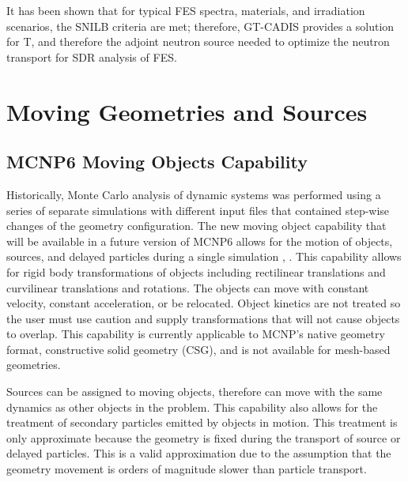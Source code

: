 It has been shown that for typical FES spectra, materials, and irradiation
scenarios, the SNILB criteria are met; therefore, GT-CADIS provides a solution
for T, and therefore the adjoint neutron source needed to optimize the neutron
transport for SDR analysis of FES.


\section{Moving Geometries and Sources} \label{sec:moving_sys}

\subsection{MCNP6 Moving Objects Capability} \label{sec:mcnp_move}
Historically, Monte Carlo analysis of dynamic systems was performed using a 
series of separate simulations with different input files that contained 
step-wise changes of the geometry configuration. 
The new moving object capability that will be available in a future version
of MCNP6 allows for the
motion of objects, sources, and delayed particles during a single simulation
\cite{mcnp_moving_1}, \cite{mcnp_moving_2}.
This capability allows for rigid body transformations of 
objects including rectilinear translations and curvilinear translations and rotations.
The objects can move with constant velocity, constant acceleration, or be
relocated.
Object kinetics are not treated so the user must use caution and supply
transformations that will not cause objects to overlap.
This capability is currently applicable to MCNP's native geometry format,
constructive solid geometry (CSG), and is not available for mesh-based
geometries.

Sources can be assigned to moving objects, therefore can move with the
same dynamics as other objects in the problem.
This capability also allows for the treatment of secondary particles emitted by
objects in motion. This treatment is only approximate because the geometry is fixed during the
transport of source or delayed particles. This is a valid approximation due to
the assumption that the geometry movement is orders of magnitude slower than
particle transport.

